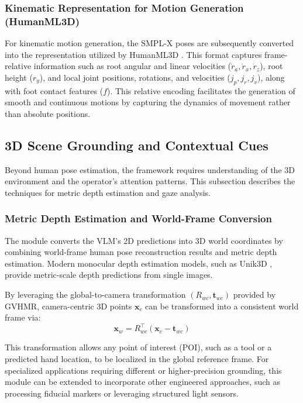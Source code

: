 \subsubsection{Kinematic Representation for Motion Generation (HumanML3D)}

For kinematic motion generation, the SMPL-X poses are subsequently converted into the representation utilized by HumanML3D \citep{Guo_2022_CVPR}. This format captures frame-relative information such as root angular and linear velocities ($\dot{r}_a, \dot{r}_x, \dot{r}_z$), root height ($r_y$), and local joint positions, rotations, and velocities ($j_p, j_r, j_v$), along with foot contact features ($f$). This relative encoding facilitates the generation of smooth and continuous motions by capturing the dynamics of movement rather than absolute positions.

\subsection{3D Scene Grounding and Contextual Cues}

Beyond human pose estimation, the framework requires understanding of the 3D environment and the operator's attention patterns. This subsection describes the techniques for metric depth estimation and gaze analysis.

\subsubsection{Metric Depth Estimation and World-Frame Conversion}

The module converts the VLM's 2D predictions into 3D world coordinates by combining world-frame human pose reconstruction results and metric depth estimation. Modern monocular depth estimation models, such as Unik3D \citep{unik3d}, provide metric-scale depth predictions from single images.

By leveraging the global-to-camera transformation $(R_{wc}, \mathbf{t}_{wc})$ provided by GVHMR, camera-centric 3D points $\mathbf{x}_c$ can be transformed into a consistent world frame via:
\begin{equation}
    \mathbf{x}_w = R_{wc}^\top (\mathbf{x}_c - \mathbf{t}_{wc})
\end{equation}

This transformation allows any point of interest (POI), such as a tool or a predicted hand location, to be localized in the global reference frame. For specialized applications requiring different or higher-precision grounding, this module can be extended to incorporate other engineered approaches, such as processing fiducial markers or leveraging structured light sensors.

